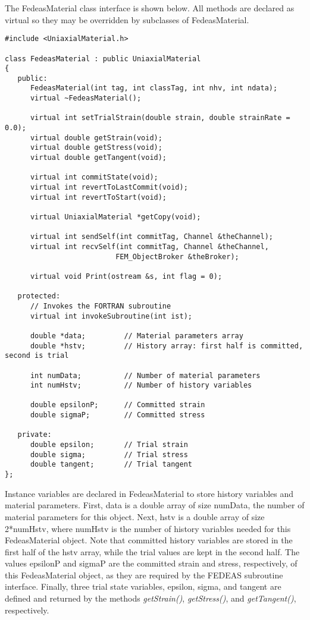 \documentclass[12pt]{article}
\begin{document}
The FedeasMaterial class interface is shown below. All methods are declared as virtual
so they may be overridden by subclasses of FedeasMaterial.

{\sf\small
\begin{verbatim}
#include <UniaxialMaterial.h>

class FedeasMaterial : public UniaxialMaterial
{
   public:
      FedeasMaterial(int tag, int classTag, int nhv, int ndata);
      virtual ~FedeasMaterial();
     
      virtual int setTrialStrain(double strain, double strainRate = 0.0);
      virtual double getStrain(void);
      virtual double getStress(void);
      virtual double getTangent(void);
     
      virtual int commitState(void);
      virtual int revertToLastCommit(void);    
      virtual int revertToStart(void);        
     
      virtual UniaxialMaterial *getCopy(void);
     
      virtual int sendSelf(int commitTag, Channel &theChannel);  
      virtual int recvSelf(int commitTag, Channel &theChannel, 
                          FEM_ObjectBroker &theBroker);    
     
      virtual void Print(ostream &s, int flag = 0);
     
   protected:
      // Invokes the FORTRAN subroutine
      virtual int invokeSubroutine(int ist);
     
      double *data;         // Material parameters array
      double *hstv;         // History array: first half is committed, second is trial
     
      int numData;          // Number of material parameters
      int numHstv;          // Number of history variables
     
      double epsilonP;      // Committed strain
      double sigmaP;        // Committed stress
     
   private:
      double epsilon;       // Trial strain
      double sigma;         // Trial stress
      double tangent;       // Trial tangent
};
\end{verbatim}
}

Instance variables are declared in FedeasMaterial to store history variables and material
parameters.  First, data is a double array of size numData, the number of material
parameters for this object. Next, hstv is a double array of size 2*numHstv, where numHstv is
the number of history variables needed for this FedeasMaterial object. Note that committed
history variables are stored in the first half of the hstv array, while the trial values
are kept in the second half. The values epsilonP and sigmaP are the committed strain and
stress, respectively, of this FedeasMaterial object, as they
are required by the FEDEAS subroutine interface. Finally, three trial state variables,
epsilon, sigma, and tangent are defined and returned by the methods {\em getStrain()},
{\em getStress()}, and {\em getTangent()}, respectively.
\end{document}
